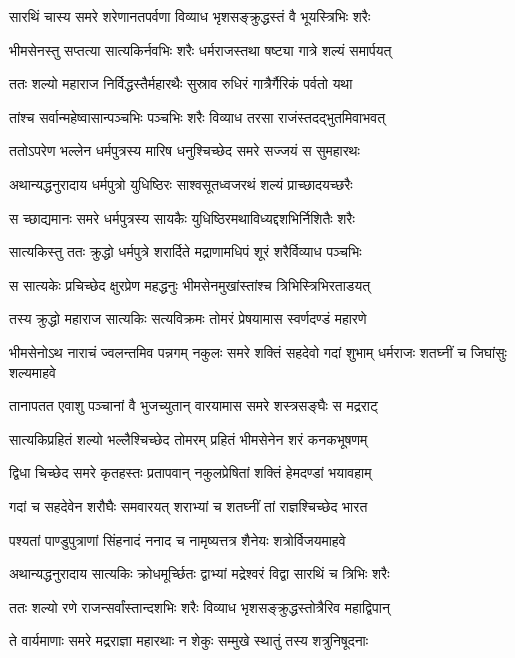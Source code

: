 \twolineshloka
{सारथिं चास्य समरे शरेणानतपर्वणा}
{विव्याध भृशसङ्क्रुद्धस्तं वै भूयस्त्रिभिः शरैः}


\twolineshloka
{भीमसेनस्तु सप्तत्या सात्यकिर्नवभिः शरैः}
{धर्मराजस्तथा षष्ट्या गात्रे शल्यं समार्पयत्}


\twolineshloka
{ततः शल्यो महाराज निर्विद्धस्तैर्महारथैः}
{सुस्राव रुधिरं गात्रैर्गैरिकं पर्वतो यथा}


\twolineshloka
{तांश्च सर्वान्महेष्वासान्पञ्चभिः पञ्चभिः शरैः}
{विव्याध तरसा राजंस्तदद्भुतमिवाभवत्}


\twolineshloka
{ततोऽपरेण भल्लेन धर्मपुत्रस्य मारिष}
{धनुश्चिच्छेद समरे सज्जयं स सुमहारथः}


\twolineshloka
{अथान्यद्धनुरादाय धर्मपुत्रो युधिष्ठिरः}
{साश्वसूतध्वजरथं शल्यं प्राच्छादयच्छरैः}


\twolineshloka
{स च्छाद्यमानः समरे धर्मपुत्रस्य सायकैः}
{युधिष्ठिरमथाविध्यद्दशभिर्निशितैः शरैः}


\twolineshloka
{सात्यकिस्तु ततः क्रुद्धो धर्मपुत्रे शरार्दिते}
{मद्राणामधिपं शूरं शरैर्विव्याध पञ्चभिः}


\twolineshloka
{स सात्यकेः प्रचिच्छेद क्षुरप्रेण महद्धनुः}
{भीमसेनमुखांस्तांश्च त्रिभिस्त्रिभिरताडयत्}


\twolineshloka
{तस्य क्रुद्धो महाराज सात्यकिः सत्यविक्रमः}
{तोमरं प्रेषयामास स्वर्णदण्डं महारणे}


\threelineshloka
{भीमसेनोऽथ नाराचं ज्वलन्तमिव पन्नगम्}
{नकुलः समरे शक्तिं सहदेवो गदां शुभाम्}
{धर्मराजः शतघ्नीं च जिघांसुः शल्यमाहवे}


\twolineshloka
{तानापतत एवाशु पञ्चानां वै भुजच्युतान्}
{वारयामास समरे शस्त्रसङ्घैः स मद्रराट्}


\twolineshloka
{सात्यकिप्रहितं शल्यो भल्लैश्चिच्छेद तोमरम्}
{प्रहितं भीमसेनेन शरं कनकभूषणम्}


\twolineshloka
{द्विधा चिच्छेद समरे कृतहस्तः प्रतापवान्}
{नकुलप्रेषितां शक्तिं हेमदण्डां भयावहाम्}


\twolineshloka
{गदां च सहदेवेन शरौघैः समवारयत्}
{शराभ्यां च शतघ्नीं तां राज्ञश्चिच्छेद भारत}


\twolineshloka
{पश्यतां पाण्डुपुत्राणां सिंहनादं ननाद च}
{नामृष्यत्तत्र शैनेयः शत्रोर्विजयमाहवे}


\twolineshloka
{अथान्यद्धनुरादाय सात्यकिः क्रोधमूर्च्छितः}
{द्वाभ्यां मद्रेश्वरं विद्वा सारथिं च त्रिभिः शरैः}


\twolineshloka
{ततः शल्यो रणे राजन्सर्वांस्तान्दशभिः शरैः}
{विव्याध भृशसङ्क्रुद्धस्तोत्रैरिव महाद्विपान्}


\twolineshloka
{ते वार्यमाणाः समरे मद्रराज्ञा महारथाः}
{न शेकुः सम्मुखे स्थातुं तस्य शत्रुनिषूदनाः}


